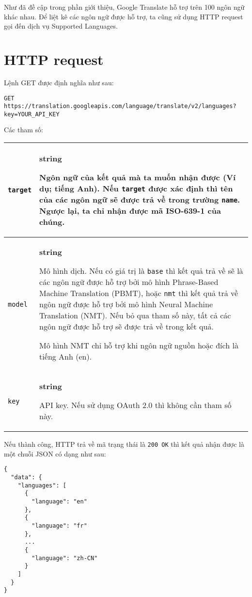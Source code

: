 \documentclass[../thesis.tex]{subfiles}
\begin{document}
Như đã đề cập trong phần giới thiệu, Google Translate hỗ trợ trên 100 ngôn ngữ khác nhau. Để liệt kê các ngôn ngữ được hỗ trợ, ta cũng sử dụng HTTP request gọi đến dịch vụ Supported Languages.

\section{HTTP request}

Lệnh GET được định nghĩa như sau:

\begin{lstlisting}[numbers=none, frame=single,xleftmargin=0.15cm,xrightmargin=0.15cm]
GET https://translation.googleapis.com/language/translate/v2/languages?key=YOUR_API_KEY
\end{lstlisting}

Các tham số:

\begin{center}
\begin{tabularx}{\textwidth}{|p{}|X|}
\hline
\lstinline{target} & \textbf{string}

Ngôn ngữ của kết quả mà ta muốn nhận được (Ví dụ; tiếng Anh). Nếu \lstinline{target} được xác định thì tên của các ngôn ngữ sẽ được trả về trong trường \lstinline{name}. Ngược lại, ta chỉ nhận được mã ISO-639-1 của chúng.\\
\hline
\lstinline{model} & \textbf{string}

Mô hình dịch. Nếu có giá trị là \lstinline{base} thì kết quả trả về sẽ là các ngôn ngữ được hỗ trợ bởi mô hình Phrase-Based Machine Translation (PBMT), hoặc \lstinline{nmt} thì kết quả trả về ngôn ngữ được hỗ trợ bởi mô hình Neural Machine Translation (NMT). Nếu bỏ qua tham số này, tất cả các ngôn ngữ được hỗ trợ sẽ được trả về trong kết quả.

Mô hình NMT chỉ hỗ trợ khi ngôn ngữ nguồn hoặc đích là tiếng Anh (en).\\
\hline
\lstinline{key} & \textbf{string}

API key. Nếu sử dụng OAuth 2.0 thì không cần tham số này.\\
\hline
\end{tabularx}
\end{center}

Nếu thành công, HTTP trả về mã trạng thái là \lstinline{200 OK} thì kết quả nhận được là một chuỗi JSON có dạng như sau:

\begin{lstlisting}[numbers=none, frame=single,xleftmargin=0.15cm,xrightmargin=0.15cm]
{
  "data": {
    "languages": [
      {
        "language": "en"
      },
      {
        "language": "fr"
      },
      ...
      {
        "language": "zh-CN"
      }
    ]
  }
}
\end{lstlisting}
\end{document}
